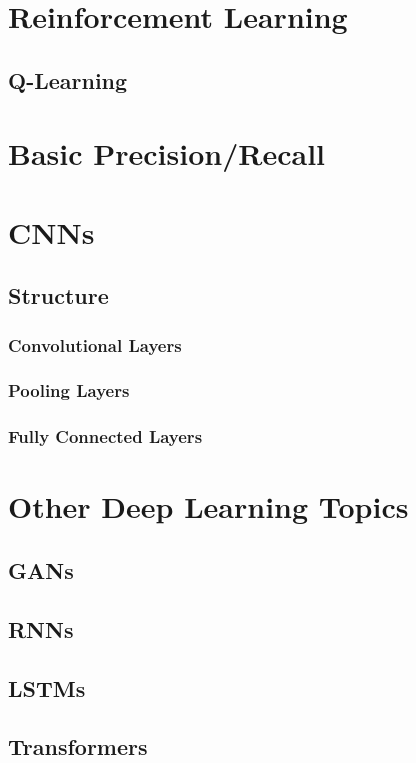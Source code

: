 \documentclass[10pt]{report}
\begin{document}
\chapter{Reinforcement Learning}
\section{Q-Learning}

\chapter{Basic Precision/Recall}

\chapter{CNNs}
\section{Structure}
\subsection{Convolutional Layers}
\subsection{Pooling Layers}
\subsection{Fully Connected Layers}

\chapter{Other Deep Learning Topics}
\section{GANs}
\section{RNNs}
\section{LSTMs}
\section{Transformers}
\end{document}
